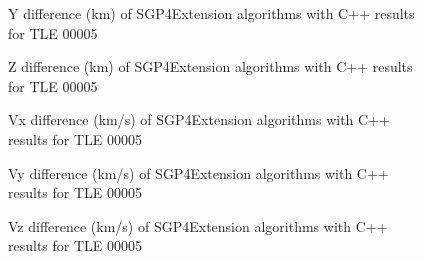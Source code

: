 \documentclass{article}
\begin{document}
\begin{figure}
    
    \label{fig:dy}
    \caption{Y difference (km) of SGP4Extension algorithms with C++ results for TLE 00005}
\end{figure}

\begin{figure}
    
    \label{fig:dz}
    \caption{Z difference (km) of SGP4Extension algorithms with C++ results for TLE 00005}
\end{figure}

\begin{figure}
    
    \label{fig:dvx}
    \caption{Vx difference (km/s) of SGP4Extension algorithms with C++ results for TLE 00005}
\end{figure}

\begin{figure}
    
    \label{fig:dvy}
    \caption{Vy difference (km/s) of SGP4Extension algorithms with C++ results for TLE 00005}
\end{figure}

\begin{figure}
    
    \label{fig:dvz}
    \caption{Vz difference (km/s) of SGP4Extension algorithms with C++ results for TLE 00005}
\end{figure}
\end{document}
